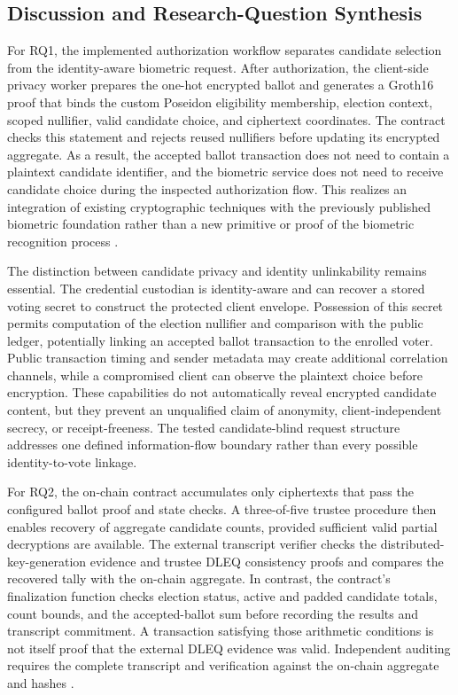 \subsection{Discussion and Research-Question Synthesis}
\label{subsec:discussion-privacy}
\label{subsec:discussion-implications}

For RQ1, the implemented authorization workflow separates candidate selection from the identity-aware biometric request. After authorization, the client-side privacy worker prepares the one-hot encrypted ballot and generates a Groth16 proof that binds the custom Poseidon eligibility membership, election context, scoped nullifier, valid candidate choice, and ciphertext coordinates. The contract checks this statement and rejects reused nullifiers before updating its encrypted aggregate. As a result, the accepted ballot transaction does not need to contain a plaintext candidate identifier, and the biometric service does not need to receive candidate choice during the inspected authorization flow. This realizes an integration of existing cryptographic techniques with the previously published biometric foundation rather than a new primitive or proof of the biometric recognition process \citep{rifat2026biometric,groth2016snark,huber2025ballotvalidity}.

The distinction between candidate privacy and identity unlinkability remains essential. The credential custodian is identity-aware and can recover a stored voting secret to construct the protected client envelope. Possession of this secret permits computation of the election nullifier and comparison with the public ledger, potentially linking an accepted ballot transaction to the enrolled voter. Public transaction timing and sender metadata may create additional correlation channels, while a compromised client can observe the plaintext choice before encryption. These capabilities do not automatically reveal encrypted candidate content, but they prevent an unqualified claim of anonymity, client-independent secrecy, or receipt-freeness. The tested candidate-blind request structure addresses one defined information-flow boundary rather than every possible identity-to-vote linkage.

For RQ2, the on-chain contract accumulates only ciphertexts that pass the configured ballot proof and state checks. A three-of-five trustee procedure then enables recovery of aggregate candidate counts, provided sufficient valid partial decryptions are available. The external transcript verifier checks the distributed-key-generation evidence and trustee DLEQ consistency proofs and compares the recovered tally with the on-chain aggregate. In contrast, the contract's finalization function checks election status, active and padded candidate totals, count bounds, and the accepted-ballot sum before recording the results and transcript commitment. A transaction satisfying those arithmetic conditions is not itself proof that the external DLEQ evidence was valid. Independent auditing requires the complete transcript and verification against the on-chain aggregate and hashes \citep{cramer1997multiauthority,cortier2016sok}.

